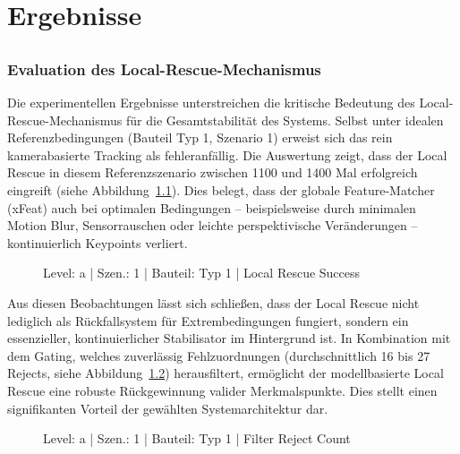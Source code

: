 \chapter{Ergebnisse}
\label{ch:ergebnisse}


\section{}

\subsection{Evaluation des Local-Rescue-Mechanismus}
\label{sec:ergebnisse_local_rescue}

Die experimentellen Ergebnisse unterstreichen die kritische Bedeutung des Local-Rescue-Mechanismus für die Gesamtstabilität des Systems. Selbst unter idealen Referenzbedingungen (Bauteil Typ 1, Szenario 1) erweist sich das rein kamerabasierte Tracking als fehleranfällig. Die Auswertung zeigt, dass der Local Rescue in diesem Referenzszenario zwischen 1100 und 1400 Mal erfolgreich eingreift (siehe Abbildung~\ref{fig:a_1_Typ1_local_rescue_success}). Dies belegt, dass der globale Feature-Matcher (xFeat) auch bei optimalen Bedingungen -- beispielsweise durch minimalen Motion Blur, Sensorrauschen oder leichte perspektivische Veränderungen -- kontinuierlich Keypoints verliert. 

\begin{figure}[htbp]
    \centering
    \caption{Level: a | Szen.: 1 | Bauteil: Typ 1 | Local Rescue Success}
    \label{fig:a_1_Typ1_local_rescue_success}
\end{figure}

Aus diesen Beobachtungen lässt sich schließen, dass der Local Rescue nicht lediglich als Rückfallsystem für Extrembedingungen fungiert, sondern ein essenzieller, kontinuierlicher Stabilisator im Hintergrund ist. In Kombination mit dem Gating, welches zuverlässig Fehlzuordnungen (durchschnittlich 16 bis 27 Rejects, siehe Abbildung~\ref{fig:a_1_Typ1_filter_reject_count}) herausfiltert, ermöglicht der modellbasierte Local Rescue eine robuste Rückgewinnung valider Merkmalspunkte. Dies stellt einen signifikanten Vorteil der gewählten Systemarchitektur dar.

\begin{figure}[htbp]
    \centering
    \caption{Level: a | Szen.: 1 | Bauteil: Typ 1 | Filter Reject Count}
    \label{fig:a_1_Typ1_filter_reject_count}
\end{figure}

